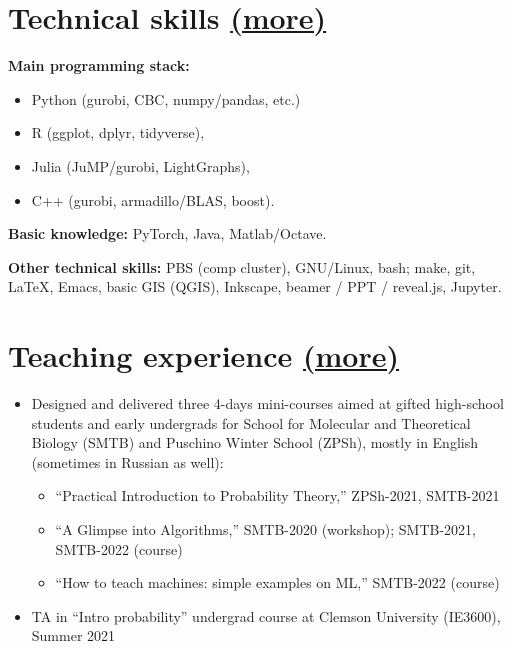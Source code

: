 \documentclass[11pt]{article} \usepackage{geometry} %
\newcommand{\mhref}[1]{\hfill\href{#1}{\small (more\faExternalLink*)}}
\begin{document}
\begin{minipage}[t]{0.49\textwidth}
   \section*{Technical skills \mhref{https://www.bochkarev.io/notes/stack/}}
   \textbf{Main programming stack:}
   \begin{itemize}
     \itemsep0pt
   \item Python (gurobi, CBC, numpy/pandas, etc.)
     \item R (ggplot, dplyr, tidyverse),
     \item Julia (JuMP/gurobi, LightGraphs),
     \item C++ (gurobi, armadillo/BLAS, boost).
   \end{itemize}\vspace{0.5em}
   \textbf{Basic knowledge:} PyTorch, Java, Matlab/Octave. \vspace{1em}

   \textbf{Other technical skills:}
   PBS (comp cluster), GNU/Linux, bash; make, git, \LaTeX, Emacs, basic GIS
   (QGIS), Inkscape, beamer / PPT / reveal.js, Jupyter.
   \end{minipage}
   \vspace{1em}

   \section*{Teaching experience \mhref{https://www.bochkarev.io/teaching/}}
   \begin{itemize}
     \itemsep0pt
      \item Designed and delivered three 4-days mini-courses aimed at gifted
      high-school students and early undergrads for School for Molecular and
      Theoretical Biology (SMTB) and Puschino Winter School (ZPSh), mostly in English
      (sometimes in Russian as well):
      \begin{itemize}
        \itemsep0pt
        \item ``Practical Introduction to Probability Theory,'' ZPSh-2021,
          SMTB-2021
        \item ``A Glimpse into Algorithms,'' SMTB-2020 (workshop); SMTB-2021, SMTB-2022 (course)
        \item ``How to teach machines: simple examples on ML,'' SMTB-2022 (course)
      \end{itemize}
      \item TA in ``Intro probability'' undergrad course at Clemson University
        (IE3600), Summer 2021
\end{itemize}
\end{document}
